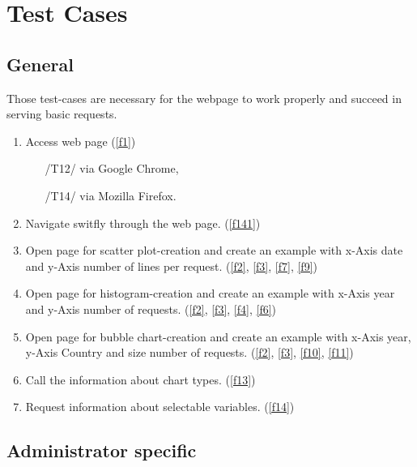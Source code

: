 \section{Test Cases}


\renewcommand{\theenumi}{/T\arabic{enumi}0/}
\renewcommand{\labelenumi}{\theenumi}

\subsection{General}

Those test-cases are necessary for the webpage to work 
properly and succeed in serving basic requests.

\begin{enumerate}

\item Access web page (\ref{f1})
\begin{enumerate}
  \item[/T12/] via Google Chrome,
  \item[/T14/] via Mozilla Firefox.
\end{enumerate}
\label{t10}

\item Navigate switfly through the web page. (\ref{f141}) 
\label{t11}

\item Open page for scatter plot-creation and create an example
      with x-Axis date and y-Axis number of lines per request. (\ref{f2}, \ref{f3}, \ref{f7}, \ref{f9})
\label{t12}

\item Open page for histogram-creation and create an example
      with x-Axis year and y-Axis number of requests. (\ref{f2}, \ref{f3}, \ref{f4}, \ref{f6})
\label{t13}

\item Open page for bubble chart-creation and create an example
      with x-Axis year, y-Axis Country and size number of requests. (\ref{f2}, \ref{f3}, \ref{f10}, \ref{f11})
\label{t14}

\item Call the information about chart types. (\ref{f13})
\label{t15}

\item Request information about selectable variables. (\ref{f14})
\label{t16}

\end{enumerate}

\subsection{Administrator specific}

